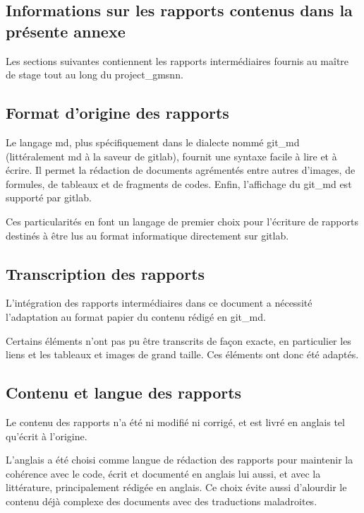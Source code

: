 
\begin{nohyphen}
\section{Informations sur les rapports contenus dans la présente annexe} \label{report_infos}
Les sections suivantes contiennent les rapports intermédiaires fournis au maître de stage tout au long du \gls{project_gmsnn}.

\subsection{Format d'origine des rapports}
Le langage \gls{md}, plus spécifiquement dans le dialecte nommé \gls{git_md} (littéralement \og \gls{md} à la saveur de \gls{gitlab}\fg{}), fournit une syntaxe facile à lire et à écrire. %
Il permet la rédaction de documents agrémentés entre autres d'images, de formules, de tableaux et de fragments de codes.
Enfin, l'affichage du \gls{git_md} est supporté par \gls{gitlab}. %

Ces particularités en font un langage de premier choix pour l'écriture de rapports destinés à être lus au format informatique directement sur \gls{gitlab}.

\subsection{Transcription des rapports}
L'intégration des rapports intermédiaires dans ce document a nécessité l'adaptation au format papier du contenu rédigé en \gls{git_md}.

Certains éléments n'ont pas pu être transcrits de façon exacte, en particulier les liens et les tableaux et images de grand taille. Ces éléments ont donc été adaptés.

\subsection{Contenu et langue des rapports}
Le contenu des rapports n'a été ni modifié ni corrigé, et est livré en anglais tel qu'écrit à l'origine.

L'anglais a été choisi comme langue de rédaction des rapports pour maintenir la cohérence avec le code, écrit et documenté en anglais lui aussi, et avec la littérature, principalement rédigée en anglais.
Ce choix évite aussi d'alourdir le contenu déjà complexe des documents avec des traductions maladroites. %

\end{nohyphen}

